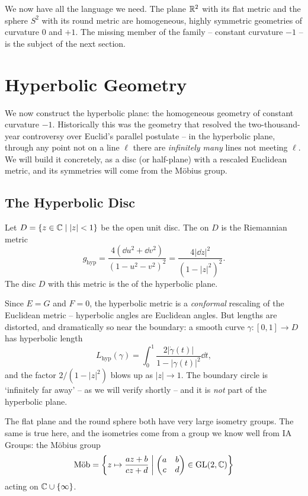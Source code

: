 \documentclass[a4paper]{scrartcl}
\newcommand{\Mob}{\text{M\"ob}}
\begin{document}
We now have all the language we need. The plane $\mathbb{R}^2$ with its flat metric and the sphere $S^2$ with its round metric are homogeneous, highly symmetric geometries of curvature $0$ and $+1$. The missing member of the family -- constant curvature $-1$ -- is the subject of the next section.

\section{Hyperbolic Geometry}

We now construct the hyperbolic plane: the homogeneous geometry of constant curvature $-1$. Historically this was the geometry that resolved the two-thousand-year controversy over Euclid's parallel postulate -- in the hyperbolic plane, through any point not on a line $\ell$ there are \emph{infinitely many} lines not meeting $\ell$. We will build it concretely, as a disc (or half-plane) with a rescaled Euclidean metric, and its symmetries will come from the M\"obius group.

\subsection{The Hyperbolic Disc}

\begin{definition}
    Let $D = \{z \in \mathbb{C} \mid |z| < 1\}$ be the open unit disc. The  on $D$ is the Riemannian metric
    $$
    g_{\mathrm{hyp}} = \frac{4 (\dd u^2 + \dd v^2)}{(1 - u^2 - v^2)^2} = \frac{4|\dd z|^2}{(1 - |z|^2)^2}.
    $$
    The disc $D$ with this metric is the  of the hyperbolic plane.
\end{definition}

Since $E = G$ and $F = 0$, the hyperbolic metric is a \emph{conformal} rescaling of the Euclidean metric -- hyperbolic angles are Euclidean angles. But lengths are distorted, and dramatically so near the boundary: a smooth curve $\gamma: [0,1] \rightarrow D$ has hyperbolic length
$$
L_{\mathrm{hyp}}(\gamma) = \int_0^1 \frac{2 |\dot\gamma(t)|}{1 - |\gamma(t)|^2} \dd t,
$$
and the factor $2/(1 - |z|^2)$ blows up as $|z| \rightarrow 1$. The boundary circle is `infinitely far away' -- as we will verify shortly -- and it is \emph{not} part of the hyperbolic plane.

The flat plane and the round sphere both have very large isometry groups. The same is true here, and the isometries come from a group we know well from IA Groups: the M\"obius group
$$
\Mob = \left\{z \mapsto \frac{az + b}{cz + d} \;\middle|\; \begin{pmatrix} a & b \\ c & d\end{pmatrix} \in \GL(2, \C)\right\}
$$
acting on $\mathbb{C} \cup \{\infty\}$.
\end{document}
